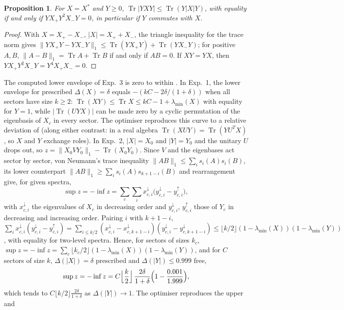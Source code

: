 \documentclass[11pt]{article}
\DeclareMathOperator{\Tr}{Tr}
\newtheorem{proposition}{Proposition}
\begin{document}
\begin{proposition}
For $X=X^*$ and $Y\ge0$, $\Tr|YXY|\le\Tr(Y|X|Y)$, with equality if and only if $YX_+Y^2X_-Y=0$, in particular
if $Y$ commutes with $X$.
\end{proposition}
\begin{proof}
With $X=X_+-X_-$, $|X|=X_++X_-$, the triangle inequality for the trace norm gives
$\|YX_+Y-YX_-Y\|_1\le\Tr(YX_+Y)+\Tr(YX_-Y)$; for positive $A,B$, $\|A-B\|_1=\Tr A+\Tr B$ if and only if
$AB=0$. If $XY=YX$, then $YX_+Y^2X_-Y=Y^4X_+X_-=0$.
\end{proof}
\noindent The computed lower envelope of Exp.~3 is zero to within . In Exp.~1, the lower envelope
for prescribed $\Delta(X)=\delta$ equals $-(kC-2\delta/(1+\delta))$ when all sectors have size $k\ge2$:
$\Tr(XY)\le\Tr X\le kC-1+\lambda_{\min}(X)$ with equality for $Y=1$, while $|\Tr(UYX)|$ can be made zero
by a cyclic permutation of the eigenbasis of $X_c$ in every sector. The optimiser reproduces this curve to a relative deviation of
 (along either contrast: in a real algebra
$\Tr(XUY)=\Tr(YU^TX)$, so $X$ and $Y$ exchange roles). In Exp.~2, $|X|=X_0$ and
$|Y|=Y_0$ and the unitary $U$ drops out, so $z=\|X_0VY_0\|_1-\Tr(X_0Y_0)$. Since $V$ and the eigenbases act
sector by sector, von Neumann's trace inequality $\|AB\|_1\le\sum_is_i(A)s_i(B)$, its lower counterpart
$\|AB\|_1\ge\sum_is_i(A)s_{k+1-i}(B)$ and rearrangement give, for given spectra,
\[
  \sup z=-\inf z=\sum_c\sum_i x_{c,i}^\downarrow\bigl(y_{c,i}^\downarrow-y_{c,i}^\uparrow\bigr),
\]
with $x_{c,i}^\downarrow$ the eigenvalues of $X_c$ in decreasing order and $y_{c,i}^\downarrow$, $y_{c,i}^\uparrow$ those of
$Y_c$ in decreasing and increasing order. Pairing $i$ with $k+1-i$,
$\sum_ix_{c,i}^\downarrow(y_{c,i}^\downarrow-y_{c,i}^\uparrow)=\sum_{i\le k/2}(x_{c,i}^\downarrow-x_{c,k+1-i}^\downarrow)
(y_{c,i}^\downarrow-y_{c,k+1-i}^\downarrow)\le\lfloor k/2\rfloor(1-\lambda_{\min}(X))(1-\lambda_{\min}(Y))$, with equality
for two-level spectra. Hence, for sectors of sizes $k_c$, $\sup z=-\inf z=\sum_c\lfloor k_c/2\rfloor(1-\lambda_{\min}(X))(1-\lambda_{\min}(Y))$, and for
$C$ sectors of size $k$, $\Delta(|X|)=\delta$ prescribed and $\Delta(|Y|)\le0.999$
free,
\[
  \sup z=-\inf z=C\Bigl\lfloor\frac k2\Bigr\rfloor\,\frac{2\delta}{1+\delta}\Bigl(1-\frac{0.001}{1.999}\Bigr),
\]
which tends to $C\lfloor k/2\rfloor\frac{2\delta}{1+\delta}$ as $\Delta(|Y|)\to1$. The optimiser reproduces the upper and
\end{document}
